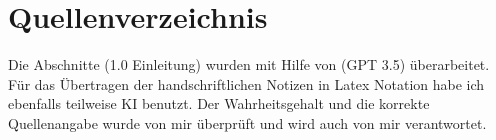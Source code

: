 \newpage
\section{Quellenverzeichnis}
Die Abschnitte (1.0 Einleitung) wurden mit Hilfe von (GPT 3.5) überarbeitet. Für das Übertragen der handschriftlichen Notizen in Latex Notation habe ich ebenfalls teilweise KI benutzt.
Der Wahrheitsgehalt und die korrekte Quellenangabe wurde von mir überprüft und wird auch von mir verantwortet.

\listoffigures[]
\printbibliography[title={Literaturverzeichnis}]
